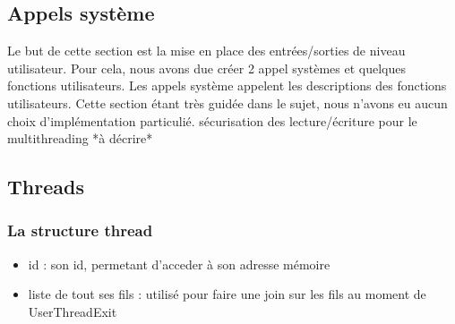 \documentclass{article}
\begin{document}
	\subsection{Appels système}
	    {Le but de cette section est la mise en place des entrées/sorties de niveau utilisateur. Pour cela, nous avons due créer 2 appel systèmes et quelques fonctions utilisateurs. Les appels système appelent les descriptions des fonctions utilisateurs. Cette section étant très guidée dans le sujet, nous n'avons eu aucun choix d'implémentation particulié.
		sécurisation des lecture/écriture pour le multithreading
		*à décrire*}
	\subsection{Threads}
		\subsubsection{La structure thread}
			\begin{itemize}
				\item id : son id, permetant d'acceder à son adresse mémoire
				\item liste de tout ses fils : utilisé pour faire une join sur les fils au moment de UserThreadExit
			\end{itemize}
\end{document}
